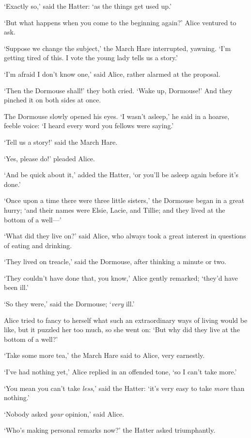 \documentclass[12pt,openany]{memoir}
\begin{document}
`Exactly so,' said the Hatter: `as the things get used up.'

`But what happens when you come to the beginning again?' Alice ventured to ask.

`Suppose we change the subject,' the March Hare interrupted, yawning. `I'm getting tired of this. I vote the young lady tells us a story.'

`I'm afraid I don't know one,' said Alice, rather alarmed at the proposal.

`Then the Dormouse shall!' they both cried. `Wake up, Dormouse!' And they pinched it on both sides at once.

The Dormouse slowly opened his eyes. `I wasn't asleep,' he said in a hoarse, feeble voice: `I heard every word you fellows were saying.'

`Tell us a story!' said the March Hare.

`Yes, please do!' pleaded Alice.

`And be quick about it,' added the Hatter, `or you'll be asleep again before it's done.'

`Once upon a time there were three little sisters,' the Dormouse began in a great hurry; `and their names were Elsie, Lacie, and Tillie; and they lived at the bottom of a well---'

`What did they live on?' said Alice, who always took a great interest in questions of eating and drinking.

`They lived on treacle,' said the Dormouse, after thinking a minute or two.

`They couldn't have done that, you know,' Alice gently remarked; `they'd have been ill.'

`So they were,' said the Dormouse; `\textit{very} ill.'

Alice tried to fancy to herself what such an extraordinary ways of living would be like, but it puzzled her too much, so she went on: `But why did they live at the bottom of a well?'

`Take some more tea,' the March Hare said to Alice, very earn\-estly.

`I've had nothing yet,' Alice replied in an offended tone, `so I can't take more.'

`You mean you can't take \textit{less},' said the Hatter: `it's very easy to take \textit{more} than nothing.'

`Nobody asked \textit{your} opinion,' said Alice.

`Who's making personal remarks now?' the Hatter asked triumphantly.
\end{document}
